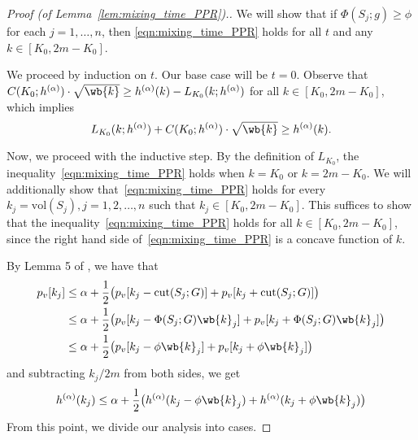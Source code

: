 \documentclass{article}
\newcommand{\vol}{\mathrm{vol}}
\newcommand{\1}{\mathbf{1}}
\theoremstyle{definition}
\theoremstyle{remark}
\begin{document}
\begin{proof}[Proof (of Lemma~\ref{lem:mixing_time_PPR}).]
	We will show that if $\Phi(S_j; g) \geq \phi$ for each $j = 1,\ldots,n$, then \eqref{eqn:mixing_time_PPR} holds for all $t$ and any $k \in [K_0,2m - K_0]$.
	
	We proceed by induction on $t$. Our base case will be $t = 0$. Observe that $C(K_0;h^{(\alpha)}) \cdot \sqrt{\wb{k}} \geq h^{(\alpha)}(k) - L_{K_0}(k;h^{(\alpha)})$ for all $k \in [K_0,2m - K_0]$, which implies
	\begin{equation*}
	L_{K_0}(k;h^{(\alpha)}) + C(K_0;h^{(\alpha)}) \cdot \sqrt{\wb{k}} \geq h^{(\alpha)}(k).
	\end{equation*}
	
	Now, we proceed with the inductive step. By the definition of $L_{K_0}$, the inequality~\eqref{eqn:mixing_time_PPR} holds when $k = K_0$ or $k = 2m - K_0$. We will additionally show that~\eqref{eqn:mixing_time_PPR} holds for every $k_j = \vol(S_j), j = 1,2,\ldots,n$ such that $k_j \in [K_0, 2m - K_0]$. This suffices to show that the inequality~\eqref{eqn:mixing_time_PPR} holds for all $k \in [K_0,2m - K_0]$, since the right hand side of~\eqref{eqn:mixing_time_PPR} is a concave function of $k$.
	
	By Lemma 5 of \citet{andersen2006}, we have that
	\begin{align}
	p_v[k_j] & \leq \alpha + \frac{1}{2} \bigl(p_v[k_j - \mathrm{cut}(S_j;G)] + p_v[k_j + \mathrm{cut}(S_j;G)] \bigr) \nonumber\\
	& \leq \alpha + \frac{1}{2} \bigl(p_v[k_j - \Phi(S_j;G) \wb{k}_j] + p_v[k_j + \Phi(S_j;G) \wb{k}_j]  \bigr) \nonumber \\
	& \leq \alpha + \frac{1}{2} \bigl(p_v[k_j - \phi \wb{k}_j] + p_v[k_j + \phi \wb{k}_j]\bigr) \nonumber
	\end{align}
	and subtracting $k_j/2m$ from both sides, we get
	\begin{equation}
	\label{eqn:mixing_time_PPR_pf1}
	h^{(\alpha)}(k_j) \leq \alpha + \frac{1}{2} \bigl(h^{(\alpha)}(k_j - \phi \wb{k}_j) + h^{(\alpha)}(k_j +  \phi \wb{k}_j) \bigr)
	\end{equation}
	From this point, we divide our analysis into cases. 
	

\end{proof}
\end{document}
